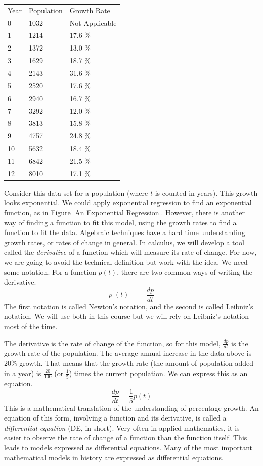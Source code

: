 \documentclass[fleqn]{report}
\begin{document}
\begin{table}[h]
\begin{tabular}{lll}
Year & Population & Growth Rate
\vspace{.3cm} \\
0 & 1032 & Not Applicable \\
1 & 1214 & 17.6 \% \\
2 & 1372 & 13.0 \% \\
3 & 1629 & 18.7 \% \\
4 & 2143 & 31.6 \% \\
5 & 2520 & 17.6 \% \\
6 & 2940 & 16.7 \% \\
7 & 3292 & 12.0 \% \\
8 & 3813 & 15.8 \% \\
9 & 4757 & 24.8 \% \\
10 & 5632 & 18.4 \% \\
11 & 6842 & 21.5 \% \\
12 & 8010 & 17.1 \% 
\end{tabular}
\end{table}

Consider this data set for a population (where $t$ is
counted in years). This growth looks exponential. We could
apply exponential regression to find an exponential function,
as in Figure \ref{An Exponential Regression}.  However, there
is another way of finding a function to fit this model, using
the growth rates to find a function to fit the data. Algebraic
techniques have a hard time understanding growth rates, or
rates of change in general. In calculus, we will develop a
tool called the \emph{derivative} of a function which will
measure its rate of change. For now, we are going to avoid the
technical definition but work with the idea. We need some
notation. For a function $p(t)$, there are two common ways of
writing the derivative.
\begin{equation*}
p^\prime(t) \hspace{1cm} \frac{dp}{dt}
\end{equation*}
The first notation is called Newton's notation, and the second
is called Leibniz's notation. We will use both in this course
but we will rely on Leibniz's notation most of the time.

The derivative is the rate of change of the function, so for
this model, $\frac{dp}{dt}$ is the growth rate of the
population. The average annual increase in the data above is
$20\%$ growth. That means that the growth rate (the amount of
population added in a year) is $\frac{20}{100}$ (or
$\frac{1}{5}$) times the
current population. We can express this as an equation.
\begin{equation*}
\frac{dp}{dt} = \frac{1}{5} p(t)
\end{equation*}
This is a mathematical translation of the understanding of
percentage growth. An equation of this form, involving a
function and its derivative, is called a \emph{differential
equation} (DE, in short). Very often in applied mathematics,
it is easier to observe the rate of change of a function than
the function itself. This leads to models expressed as 
differential equations. Many of the most important
mathematical models in history are expressed as differential
equations.
\end{document}
